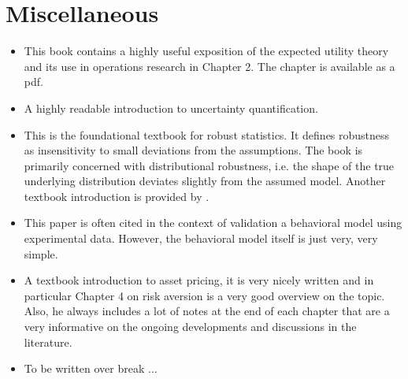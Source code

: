 \section*{Miscellaneous}
\begin{itemize}
\item {}

This book contains a highly useful exposition of the expected utility theory and its use in operations research in Chapter 2. The chapter is available as a pdf.

\item {}

A highly readable introduction to uncertainty quantification.

\item {}

This is the foundational textbook for robust statistics. It defines robustness as insensitivity to small deviations from the assumptions. The book is primarily concerned with distributional robustness, i.e. the shape of the true underlying distribution deviates slightly from the assumed model. Another textbook introduction is provided by \citet{Maronna.2006}.

\item {}

This paper is often cited in the context of validation a behavioral model using experimental data. However, the behavioral model itself is just very, very simple.

\item {}

A textbook introduction to asset pricing, it is very nicely written and in particular Chapter 4 on risk aversion is a very good overview on the topic. Also,  he always includes a lot of notes at the end of each chapter that are a very informative on the ongoing developments and discussions in the literature.

\item {}

To be written over break ...

\end{itemize}





